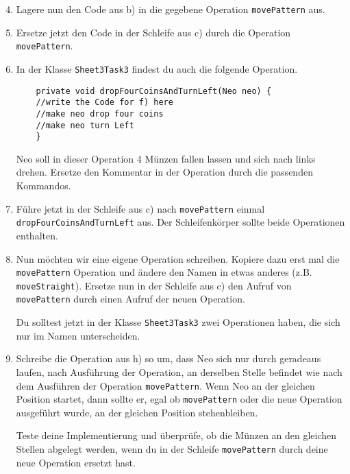 \begin{enumerate}\setcounter{enumi}{3}
	\item
	Lagere nun den Code aus b) in die gegebene Operation \lstinline{movePattern} aus.

	\item
	Ersetze jetzt den Code in der Schleife aus c) durch die Operation \lstinline{movePattern}.
	
	\item
	In der Klasse \lstinline{Sheet3Task3} findest du auch die folgende Operation.
	
	\begin{lstlisting}
	private void dropFourCoinsAndTurnLeft(Neo neo) {
	//write the Code for f) here
	//make neo drop four coins
	//make neo turn Left
	}
	\end{lstlisting}
	
	Neo soll in dieser Operation 4 Münzen fallen lassen und sich nach links drehen.
	Ersetze den Kommentar in der Operation durch die passenden Kommandos.
	
	\item
	Führe jetzt in der Schleife aus c) nach \lstinline{movePattern} einmal \lstinline{dropFourCoinsAndTurnLeft} aus.
	Der Schleifenkörper sollte beide Operationen enthalten.
	
	\item
	Nun möchten wir eine eigene Operation schreiben.
	Kopiere dazu erst mal die \lstinline{movePattern} Operation und ändere den Namen in etwas anderes (z.B. \lstinline{moveStraight}).
	Ersetze nun in der Schleife aus c) den Aufruf von \lstinline{movePattern} durch einen Aufruf der neuen Operation.
	
	Du solltest jetzt in der Klasse \lstinline{Sheet3Task3} zwei Operationen haben, die sich nur im Namen unterscheiden.
	
	\item
	Schreibe die Operation aus h) so um, dass Neo sich nur durch geradeaus laufen, nach Ausführung der Operation, an derselben Stelle befindet wie nach dem Ausführen der Operation \lstinline{movePattern}.
	Wenn Neo an der gleichen Position startet, dann sollte er, egal ob \lstinline{movePattern} oder die neue Operation ausgeführt wurde, an der gleichen Position stehenbleiben.
	
	Teste deine Implementierung und überprüfe, ob die Münzen an den gleichen Stellen abgelegt werden, wenn du in der Schleife \lstinline{movePattern} durch deine neue Operation ersetzt hast.
\end{enumerate}
\newpage
